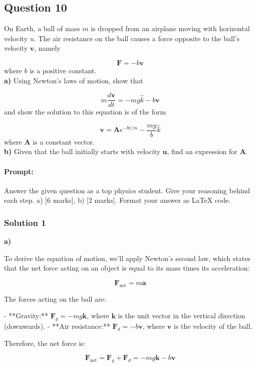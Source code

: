 \documentclass{article}
\begin{document}
\subsection{Question 10}
On Earth, a ball of mass $m$ is dropped from an airplane moving with horizontal velocity $u$. The air resistance on the ball causes a force opposite to the ball's velocity $\mathbf{v}$, namely

\[
\mathbf{F} = -b \mathbf{v}
\]
where $b$ is a positive constant. \\

\textbf{a)} Using Newton's laws of motion, show that

\[
m \frac{d \mathbf{v}}{dt} = -mg \hat{k} - b \mathbf{v}
\]
and show the solution to this equation is of the form

\[
\mathbf{v} = \mathbf{A} e^{-bt/m} - \frac{mg}{b} \hat{k}
\]
where $\mathbf{A}$ is a constant vector.\\

\textbf{b)} Given that the ball initially starts with velocity $\mathbf{u}$, find an expression for $\mathbf{A}$.

\paragraph{Prompt: \\} 
Answer the given question as a top physics student. Give your reasoning behind each step. a) [6 marks], b) [2 marks].
Format your answer as LaTeX code.

\subsubsection{Solution 1}
\textbf{a)} 

To derive the equation of motion, we'll apply Newton's second law, which states that the net force acting on an object is equal to its mass times its acceleration:

\[
\mathbf{F}_{\text{net}} = m\mathbf{a}
\]

The forces acting on the ball are:

- **Gravity:**  \(\mathbf{F}_g = -mg\mathbf{k}\), where \(\mathbf{k}\) is the unit vector in the vertical direction (downwards).
- **Air resistance:** \(\mathbf{F}_d = -b\mathbf{v}\), where \(\mathbf{v}\) is the velocity of the ball.

Therefore, the net force is:

\[
\mathbf{F}_{\text{net}} = \mathbf{F}_g + \mathbf{F}_d = -mg\mathbf{k} - b\mathbf{v}
\]
\end{document}
